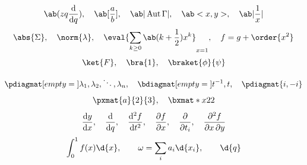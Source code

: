 \documentclass{amsart}
\begin{document}
\[ \ab(z q \odv{}{q}), \quad \ab[\frac{a}{b}], \quad \ab|\operatorname{Aut}\Gamma|, \quad \ab<x, y>, \quad \ab|\frac{1}{x}| \]
\[ \abs{\Sigma}, \quad \norm{\lambda}, \quad \eval{\sum_{k \ge 0} \ab(k + \frac{1}{2}) x^k}_{x=1}, \quad f = g + \order{x^2} \]
\[ \ket{F}, \quad \bra{1}, \quad \braket{\phi}{\psi} \]
\[ \pdiagmat[empty={}]{\lambda_1, \lambda_2, \ddots, \lambda_n}, \quad \bdiagmat[empty={}]{t^{-1},t}, \quad \pdiagmat{i,-i} \]
\[ \pxmat{a}{2}{3}, \quad \bxmat*{x}{2}{2} \]
\[ \odv{y}{x}, \quad \odv{}{q}, \quad \odv[order=2]{f}{t}, \quad \pdv{f}{x}, \quad \pdv{}{t_i}, \quad \pdv{f}{x,y} \]
\[ \int_0^1 f(x) \d{x}, \qquad \omega = \sum_i a_i \d{x_i}, \qquad \d{q} \]
\end{document}
